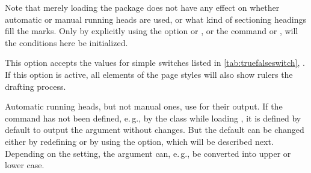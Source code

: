   Note that merely loading the package does not have any
  effect on whether automatic or manual running heads are used, or what kind
  of sectioning headings fill the marks. Only by explicitly using the option
   or , or the command
   or ,
  will the conditions here be initialized.%
  \EndIndexGroup
  \EndIndexGroup


  \begin{Declaration}
  \end{Declaration}
  This \KOMAScript{} option accepts the values for simple switches
  listed in \autoref{tab:truefalseswitch}, .
  If this option is active, all elements of the page styles will also show
  rulers%
   the drafting process.%
  \EndIndexGroup

  \begin{Declaration}
  \end{Declaration}
  Automatic running heads, but not manual ones, use  for 
  their output. If the command has not been defined, e.\,g., by the class
  while loading , it is defined by default to output the argument  without
  changes. But the default can be changed either by redefining 
   or by using the %
  option, which will be described next. Depending on the setting, the
  argument can, e.\,g., be converted into upper or lower case.%
  \EndIndexGroup


